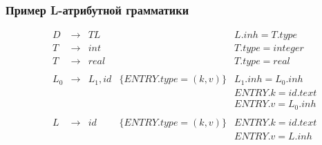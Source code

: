 \documentclass{beamer}
\begin{document}
\begin{frame}[fragile]
  \transwipe[direction=90]
  \frametitle{Пример L-атрибутной грамматики}
$$
\begin{array}{ccclll}
&D  & \rightarrow & TL      &                                & L.inh = T.type \\
&T  & \rightarrow & int     &                                & T.type = integer \\
&T  & \rightarrow & real    &                                & T.type = real \\~\\

&L_0& \rightarrow & L_1, id & \{ENTRY.type=(k, v)\} & L_1.inh = L_0.inh \\
&   &             &         &                                & ENTRY.k = id.text \\
&   &             &         &                                & ENTRY.v = L_0.inh \\~\\ 

& L & \rightarrow &  id     & \{ENTRY.type=(k, v)\} & ENTRY.k = id.text \\
&   &             &         &                                & ENTRY.v = L.inh \\
\end{array}
$$  
\end{frame}
\end{document}
